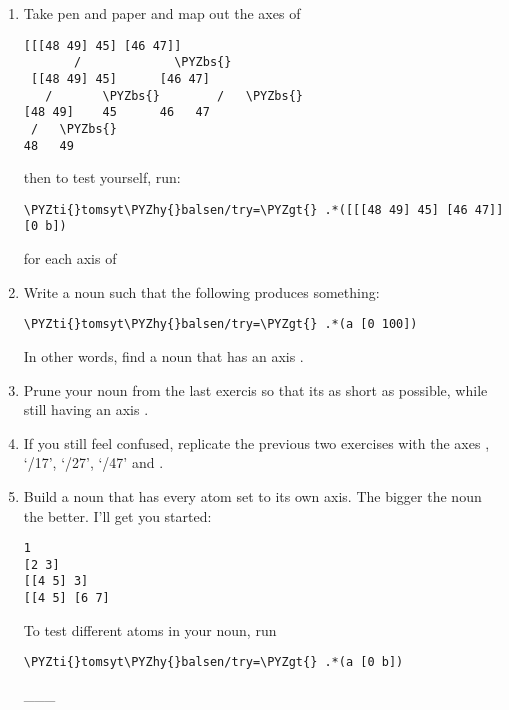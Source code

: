 \begin{enumerate}
\item Take pen and paper and map out the axes of           \newline
\begin{framed_shaded}
\begin{Verbatim}[fontsize=\relsize{-2.5},fontseries=b,commandchars=\\\{\}]
   [[[48 49] 45] [46 47]]
       /             \PYZbs{}
 [[48 49] 45]      [46 47]
   /       \PYZbs{}        /   \PYZbs{}
[48 49]    45      46   47
 /   \PYZbs{}
48   49
\end{Verbatim}
\end{framed_shaded}
then to test yourself, run:
\begin{framed_shaded}
\begin{Verbatim}[fontsize=\relsize{-2.5},fontseries=b,commandchars=\\\{\}]
\PYZti{}tomsyt\PYZhy{}balsen/try=\PYZgt{} .*([[[48 49] 45] [46 47]] [0 b])
\end{Verbatim}
\end{framed_shaded}
 for each axis  of \kode{[[[48 49] 45] [46 47]]}
\item Write a noun  such that the following produces something:
\begin{framed_shaded}
\begin{Verbatim}[fontsize=\relsize{-2.5},fontseries=b,commandchars=\\\{\}]
\PYZti{}tomsyt\PYZhy{}balsen/try=\PYZgt{} .*(a [0 100])
\end{Verbatim}
\end{framed_shaded}
 In other words, find a noun that has an axis .
\item Prune your noun from the last exercis so that its as short as possible,
while still having an axis .
\item If you still feel confused, replicate the previous two exercises with the
axes , `/17', `/27', `/47' and .
\item Build a noun that has every atom set to its own axis. The bigger the noun
the better. I'll get you started:
\begin{framed_shaded}
\begin{Verbatim}[fontsize=\relsize{-2.5},fontseries=b,commandchars=\\\{\}]
1
[2 3]
[[4 5] 3]
[[4 5] [6 7]
\end{Verbatim}
\end{framed_shaded}
To test different atoms in your noun, run 
\begin{framed_shaded}
\begin{Verbatim}[fontsize=\relsize{-2.5},fontseries=b,commandchars=\\\{\}]
\PYZti{}tomsyt\PYZhy{}balsen/try=\PYZgt{} .*(a [0 b])
\end{Verbatim}
\end{framed_shaded}
\_\_\_
\end{enumerate}

